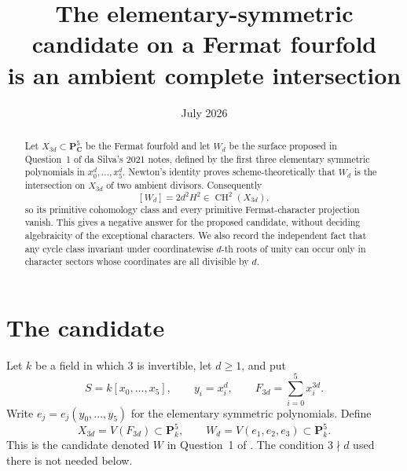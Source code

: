 \documentclass[11pt]{article}
\title{The elementary-symmetric candidate on a Fermat fourfold\\is an ambient complete intersection}
\author{}
\date{July 2026}
\DeclareMathOperator{\CH}{CH}
\begin{document}
\maketitle

\begin{abstract}
Let $X_{3d}\subset\mathbf P^5_{\mathbf C}$ be the Fermat fourfold and let
$W_d$ be the surface proposed in Question~1 of da Silva's 2021 notes, defined
by the first three elementary symmetric polynomials in
$x_0^d,\ldots,x_5^d$.  Newton's identity proves scheme-theoretically that
$W_d$ is the intersection on $X_{3d}$ of two ambient divisors.  Consequently
\[
 [W_d]=2d^2H^2\in\CH^2(X_{3d}),
\]
so its primitive cohomology class and every primitive Fermat-character
projection vanish.  This gives a negative answer for the proposed candidate,
without deciding algebraicity of the exceptional characters.  We also record
the independent fact that any cycle class invariant under coordinatewise
$d$-th roots of unity can occur only in character sectors whose coordinates
are all divisible by $d$.
\end{abstract}

\section{The candidate}
Let $k$ be a field in which $3$ is invertible, let $d\geq1$, and put
\[
 S=k[x_0,\ldots,x_5],\qquad y_i=x_i^d,
 \qquad F_{3d}=\sum_{i=0}^5x_i^{3d}.
\]
Write $e_j=e_j(y_0,\ldots,y_5)$ for the elementary symmetric polynomials.
Define
\[
 X_{3d}=V(F_{3d})\subset\mathbf P^5_k,
 \qquad W_d=V(e_1,e_2,e_3)\subset\mathbf P^5_k.
\]
This is the candidate denoted $W$ in Question~1 of \cite{daSilva}.  The
condition $3\nmid d$ used there is not needed below.
\end{document}
